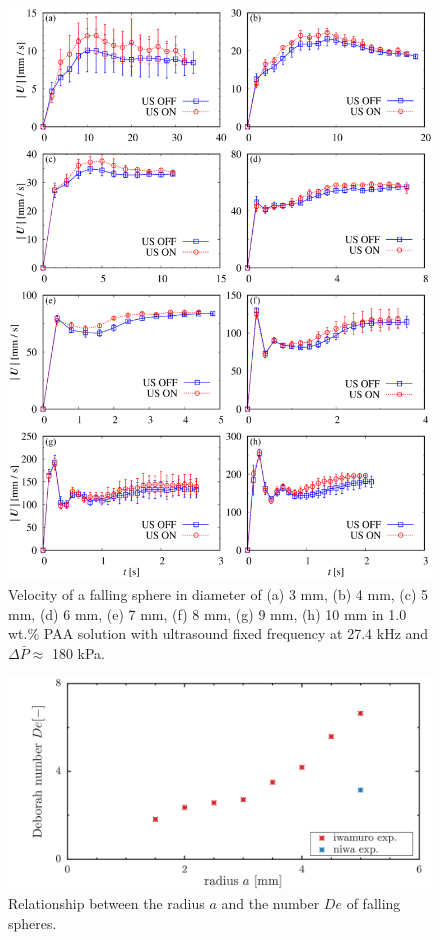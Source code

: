\begin{figure}[ht]
    \begin{center}
        \includegraphics[width=13cm,clip]{5-Discussion/iwamuro-fall.png}
    \caption{Velocity of a falling sphere in diameter of (a) 3 mm, (b) 4 mm, (c) 5 mm, (d) 6 mm, (e) 7 mm, (f) 8 mm, (g) 9 mm, (h) 10 mm in 1.0 wt.\% PAA solution with ultrasound fixed frequency at 27.4 kHz and $\Delta \bar{P} \approx$ 180 kPa\cite{ref:8}.}
    \label{fig:iwamuro-fall}
    \end{center}
\end{figure}

\begin{figure}[ht]
    \begin{center}
        \includegraphics[width=15cm,clip]{5-Discussion/Deborah.png}
        \caption{Relationship between the radius $a$ and the number $De$ of falling spheres.}
        \label{fig:a-Degraph}
    \end{center}
\end{figure}

